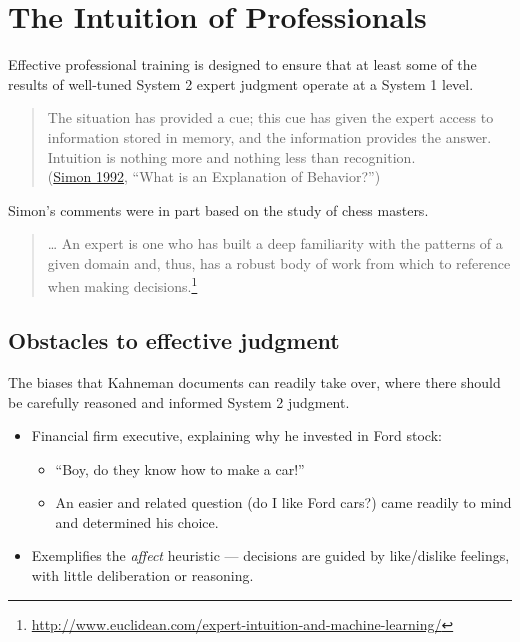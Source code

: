 \documentclass[
  10pt,
  b5paper]{book}
\providecommand{\tightlist}{%
  \setlength{\itemsep}{0pt}\setlength{\parskip}{0pt}}
\begin{document}
\hypertarget{the-intuition-of-professionals}{%
\section{The Intuition of Professionals}\label{the-intuition-of-professionals}}

Effective professional training is designed to ensure that at least
some of the results of well-tuned System 2 expert judgment operate
at a System 1 level.

\begin{quote}
The situation has provided a cue; this cue has given the expert access to information stored in memory, and the information provides the answer. Intuition is nothing more and nothing less than recognition.\\
(\protect\hyperlink{ref-simon1992explanation}{Simon 1992}, ``What is an Explanation of Behavior?'')
\end{quote}

Simon's comments were in part based on the study of chess masters.

\begin{quote}
\ldots{} An expert is one who has built a deep familiarity with the patterns of a given domain and, thus, has a robust body of work from which to reference when making decisions.\footnote{
  \url{http://www.euclidean.com/expert-intuition-and-machine-learning/}}
\end{quote}

\hypertarget{obstacles-to-effective-judgment}{%
\subsection*{Obstacles to effective judgment}\label{obstacles-to-effective-judgment}}

The biases that Kahneman documents can readily take over, where
there should be carefully reasoned and informed System 2 judgment.

\begin{itemize}
\tightlist
\item
  Financial firm executive, explaining why he invested in Ford stock:

  \begin{itemize}
  \tightlist
  \item
    ``Boy, do they know how to make a car!''
  \item
    An easier and related question (do I like Ford cars?) came
    readily to mind and determined his choice.
  \end{itemize}
\item
  Exemplifies the \emph{affect} heuristic --- decisions are guided
  by like/dislike feelings, with little deliberation or reasoning.
\end{itemize}
\end{document}
